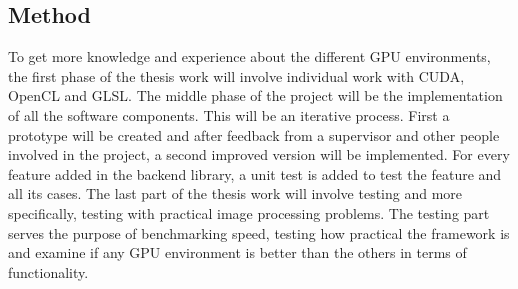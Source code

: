\subsection{Method}

To get more knowledge and experience about the different GPU environments, the first phase of the thesis work will involve individual work with CUDA, OpenCL and GLSL. The middle phase of the project will be the implementation of all the software components. This will be an iterative process. First a prototype will be created and after feedback from a supervisor and other people involved in the project, a second improved version will be implemented. For every feature added in the backend library, a unit test is added to test the feature and all its cases. The last part of the thesis work will involve testing and more specifically, testing with practical image processing problems. The testing part serves the purpose of benchmarking speed, testing how practical the framework is and examine if any GPU environment is better than the others in terms of functionality.
